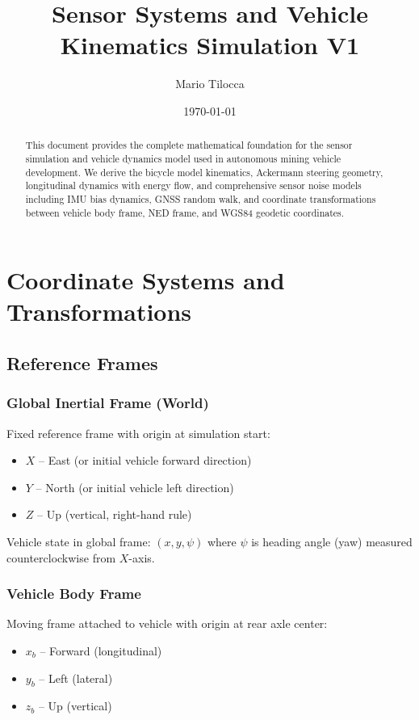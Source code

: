 \documentclass[11pt,a4paper]{article}
\title{Sensor Systems and Vehicle Kinematics Simulation V1}
\author{Mario Tilocca}
\date{\today}
\begin{document}
\maketitle

\begin{abstract}
This document provides the complete mathematical foundation for the sensor simulation and vehicle dynamics model used in autonomous mining vehicle development. We derive the bicycle model kinematics, Ackermann steering geometry, longitudinal dynamics with energy flow, and comprehensive sensor noise models including IMU bias dynamics, GNSS random walk, and coordinate transformations between vehicle body frame, NED frame, and WGS84 geodetic coordinates.
\end{abstract}

\tableofcontents
\clearpage

\section{Coordinate Systems and Transformations}

\subsection{Reference Frames}

\subsubsection{Global Inertial Frame (World)}

Fixed reference frame with origin at simulation start:
\begin{itemize}
    \item $X$ -- East (or initial vehicle forward direction)
    \item $Y$ -- North (or initial vehicle left direction)
    \item $Z$ -- Up (vertical, right-hand rule)
\end{itemize}

Vehicle state in global frame: $(x, y, \psi)$ where $\psi$ is heading angle (yaw) measured counterclockwise from $X$-axis.

\subsubsection{Vehicle Body Frame}

Moving frame attached to vehicle with origin at rear axle center:
\begin{itemize}
    \item $x_b$ -- Forward (longitudinal)
    \item $y_b$ -- Left (lateral)
    \item $z_b$ -- Up (vertical)
\end{itemize}
\end{document}
